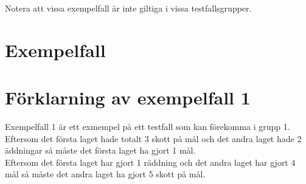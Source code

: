 Notera att vissa exempelfall är inte giltiga i vissa testfallsgrupper.

\section*{Exempelfall}

\section*{Förklarning av exempelfall 1}
Exempelfall 1 är ett exmempel på ett testfall som kan förekomma i grupp 1.\\
Eftersom det första laget hade totalt 3 skott på mål och det andra laget hade 2 äddningar så måste det första laget ha gjort 1 mål.\\
Eftersom det första laget har gjort 1 räddning och det andra laget har gjort 4 mål så måste det andra laget ha gjort 5 skott på mål.
